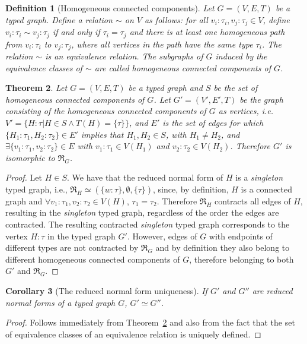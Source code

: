 \documentclass[preprint,12pt]{elsarticle}
\theoremstyle{plain}
\newtheorem{theorem}{Theorem}[section]
\newtheorem{corollary}[theorem]{Corollary}
\newtheorem{definition}[theorem]{Definition}
\newcommand\tyv[2]{#1\!\!:\!\!#2}
\begin{document}
\begin{definition}[Homogeneous connected components]\label{def:connectedcomponent}
Let $G = (V,E,T)$ be a typed graph.
Define a relation $ \sim $ on $V$ as follows: for all $\tyv{v_i}{\tau_i}, \tyv{v_j}{\tau_j} \in V$,
define $\tyv{v_i}{\tau_i} \sim \tyv{v_j}{\tau_j}$ if and only if $\tau_i = \tau_j$ and there is at least one
homogeneous path from $\tyv{v_i}{\tau_i}$ to $\tyv{v_j}{\tau_j}$,
where all vertices in the path have the same type $\tau_i$.
The relation $\sim$ is an equivalence relation.
The subgraphs of $G$ induced by the equivalence classes of $\sim $ are
called \textit{homogeneous connected components} of $G$.
\end{definition}

\begin{theorem}\label{theorem:ETCCequiv}
Let $G = (V,E,T)$ be a typed graph
and $S$ be the set of homogeneous connected components of $G$.
Let $G' = (V',E',T)$ be the graph consisting of the homogeneous connected components of $G$ as vertices, i.e.
$V' = \{\tyv{H}{\tau}|H\in S \wedge T(H) = \{\tau\} \}$, and
$E'$ is the set of edges for which $\{\tyv{H_1}{\tau_1},\tyv{H_2}{\tau_2}\}\in E'$
implies that $H_1,H_2\in S$, with $H_1\neq H_2$, and $\exists \{\tyv{v_1}{\tau_1}, \tyv{v_2}{\tau_2}\}\in E$
with $\tyv{v_1}{\tau_1}\in V(H_1)$ and $\tyv{v_2}{\tau_2}\in V(H_2)$.
Therefore $G'$ is isomorphic to $\Re_G$.
\end{theorem}
\begin{proof}
Let $H\in S$. We have that the reduced normal form of $H$ is a \textit{singleton} typed graph,
i.e., $\Re_H \simeq (\{\tyv{w}{\tau}\}, \emptyset, \{\tau\})$,
since, by definition, $H$ is a connected graph and
$\forall \tyv{v_1}{\tau_1}, \tyv{v_2}{\tau_2} \in V(H)$, $\tau_1=\tau_2$.
Therefore $\Re_H$ contracts all edges of $H$, resulting in the \textit{singleton} typed graph,
regardless of the order the edges are contracted.
The resulting contracted \textit{singleton} typed graph corresponds to the
vertex $\tyv{H}{\tau}$ in the typed graph $G'$.
However, edges of $G$ with endpoints of different types are not contracted by $\Re_G$
and by definition they also belong to different homogeneous connected components
of $G$, therefore belonging to both $G'$ and $\Re_G$.
\end{proof}

\begin{corollary}[The reduced normal form uniqueness]\label{cor:uniquereducedgraph}
If $G'$ and $G''$ are reduced normal forms of a typed graph $G$,
$G' \simeq G''$.
\end{corollary}
\begin{proof}
Follows immediately from Theorem~\ref{theorem:ETCCequiv} and also from the fact
that the set of equivalence classes of an equivalence relation is uniquely defined.
\end{proof}
\end{document}
